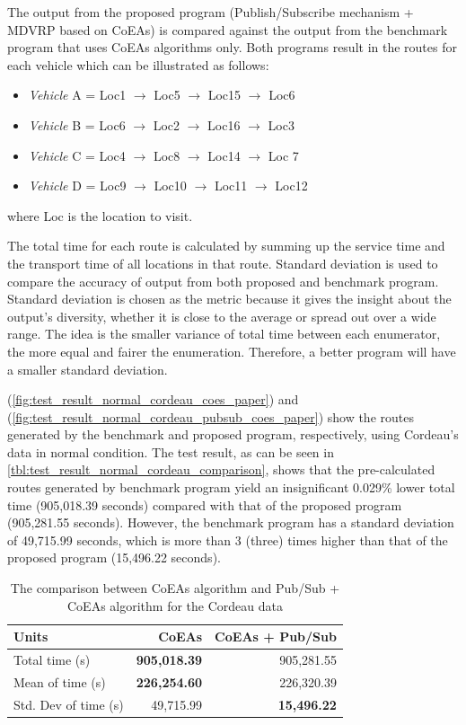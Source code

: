 \documentclass[conference]{IEEEtran}
\newcommand{\ra}[1]{\renewcommand{\arraystretch}{#1}}
\begin{document}
The output from the proposed program (Publish/Subscribe mechanism + MDVRP based on CoEAs) is compared against the output from the benchmark program that uses CoEAs algorithms only. Both programs result in the routes for each vehicle which can be illustrated as follows:

\begin{itemize}
\item \textit{Vehicle} A = Loc1 $\rightarrow$ Loc5 $\rightarrow$ Loc15 $\rightarrow$ Loc6
\item \textit{Vehicle} B = Loc6 $\rightarrow$ Loc2 $\rightarrow$ Loc16 $\rightarrow$ Loc3
\item \textit{Vehicle} C = Loc4 $\rightarrow$ Loc8 $\rightarrow$ Loc14 $\rightarrow$ Loc 7
\item \textit{Vehicle} D = Loc9 $\rightarrow$ Loc10 $\rightarrow$ Loc11 $\rightarrow$ Loc12
\end{itemize}
where Loc is the location to visit. 

The total time for each route is calculated by summing up the service time and the transport time of all locations in that route. Standard deviation is used to compare the accuracy of output from both proposed and benchmark program. Standard deviation is chosen as the metric because it gives the insight about the output's diversity, whether it is close to the average or spread out over a wide range. The idea is the smaller variance of total time between each enumerator, the more equal and fairer the enumeration. Therefore, a better program will have a smaller standard deviation.

(\autoref{fig:test_result_normal_cordeau_coes_paper}) and (\autoref{fig:test_result_normal_cordeau_pubsub_coes_paper}) show the routes generated by the benchmark and proposed program, respectively, using Cordeau's data in normal condition. The test result, as can be seen in \autoref{tbl:test_result_normal_cordeau_comparison}, shows that the pre-calculated routes generated by benchmark program yield an insignificant 0.029\% lower total time (905,018.39 seconds) compared with that of the proposed program (905,281.55 seconds). However, the benchmark program has a standard deviation of 49,715.99 seconds, which is more than 3 (three) times higher than that of the proposed program (15,496.22 seconds). 

\begin{table}[!]
	\centering
	\ra{1.3}
	\caption{The comparison between CoEAs algorithm and Pub/Sub + CoEAs algorithm for the Cordeau data}
	\label{tbl:test_result_normal_cordeau_comparison}
	\begin{tabular}{lrr}
		\toprule
		Units & CoEAs & CoEAs + Pub/Sub\\ 
		\midrule
		Total time (s) & \textbf{905,018.39} & 905,281.55\\
		Mean of time (s) & \textbf{226,254.60} & 226,320.39\\
		Std. Dev of time (s) & 49,715.99 & \textbf{15,496.22}\\
		\bottomrule
	\end{tabular}
\end{table}
\end{document}
